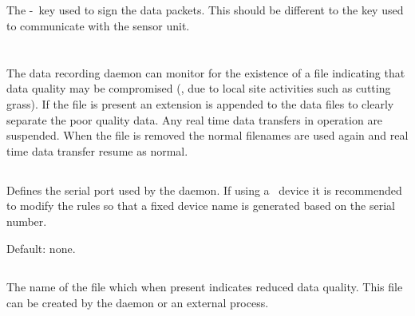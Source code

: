 \subsection{}
The \hmac-\mdfive\ key used to sign the data packets. This should be
different to the key used to communicate with the sensor unit.

\section{\code{[dataqualitymonitor]}}

The data recording daemon can monitor for the existence of a file
indicating that data quality may be compromised (\eg, due to local
site activities such as cutting grass). If the file is present an
extension is appended to the data files to clearly separate the poor
quality data. Any real time data transfers in operation are
suspended. When the file is removed the normal filenames are used
again and real time data transfer resume as normal.

\subsection{}
Defines the serial port used by the 
daemon. If using a \usb\ device it is recommended to modify the
 rules so that a fixed device name is generated based on
the serial number.


Default: none.

\subsection{}
The name of the file which when present indicates reduced data
quality. This file can be created by the 
daemon or an external process.

